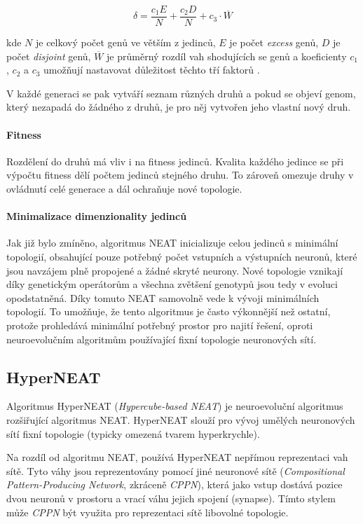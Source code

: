 \begin{equation}
    \delta = \frac{c_1E}{N} + \frac{c_2D}{N} + c_3\cdot\overline{W}
\end{equation}

kde $N$ je celkový počet genů ve větším z jedinců, $E$ je počet \emph{excess}
genů, $D$ je počet \emph{disjoint} genů, $\overline{W}$ je průměrný rozdíl vah
shodujících se genů a koeficienty $c_1$, $c_2$ a $c_3$ umožňují nastavovat
důležitost těchto tří faktorů \citep{stanley2002evolving}.

V každé generaci se pak vytváří seznam
různých druhů a pokud se objeví genom, který nezapadá do žádného z druhů, je
pro něj vytvořen jeho vlastní nový druh.

\paragraph{Fitness}
Rozdělení do druhů má vliv i na fitness jedinců. Kvalita každého jedince se při
výpočtu fitness dělí počtem jedinců stejného druhu. To zároveň omezuje druhy v
ovládnutí celé generace a dál ochraňuje nové topologie.

\paragraph{Minimalizace dimenzionality jedinců}
Jak již bylo zmíněno, algoritmus NEAT inicializuje celou jedinců s minimální
topologií, obsahující pouze potřebný počet vstupních a výstupních neuronů,
které jsou navzájem plně propojené a žádné skryté neurony. Nové topologie
vznikají díky genetickým operátorům a všechna zvětšení genotypů jsou tedy v
evoluci opodstatněná. Díky tomuto NEAT samovolně vede k vývoji minimálních
topologií. To umožňuje, že tento algoritmus je často výkonnější než ostatní,
protože prohledává minimální potřebný prostor pro najití řešení, oproti
neuroevolučním algoritmům používající fixní topologie neuronových sítí.

\subsection{HyperNEAT} \label{NN - HyperNEAT}
Algoritmus HyperNEAT (\emph{Hypercube-based NEAT}) \citep{stanley2009hypercube}
\citep{eplex} je neuroevoluční algoritmus rozšiřující algoritmus NEAT.
HyperNEAT slouží pro vývoj umělých neuronových sítí fixní topologie (typicky
omezená tvarem hyperkrychle). 

Na rozdíl od algoritmu NEAT, používá HyperNEAT nepřímou
reprezentaci vah sítě. Tyto váhy jsou reprezentovány pomocí jiné neuronové
sítě (\emph{Compositional Pattern-Producing Network}, zkráceně \emph{CPPN}),
která jako vstup dostává pozice dvou neuronů v prostoru a vrací váhu jejich
spojení (synapse). Tímto stylem může \emph{CPPN} být využita pro reprezentaci
sítě libovolné topologie. 

